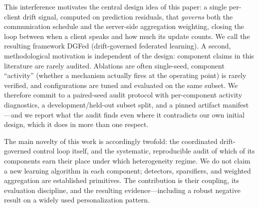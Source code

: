 \documentclass[journal]{IEEEtran}
\newcommand{\dgfed}{DGFed}
\begin{document}
This interference motivates the central design idea of this paper: a single per-client drift signal, computed on prediction residuals, that \emph{governs} both the communication schedule and the server-side aggregation weighting, closing the loop between when a client speaks and how much its update counts. We call the resulting framework \dgfed{} (drift-governed federated learning). A second, methodological motivation is independent of the design: component claims in this literature are rarely audited. Ablations are often single-seed, component ``activity'' (whether a mechanism actually fires at the operating point) is rarely verified, and configurations are tuned and evaluated on the same subset. We therefore commit to a paired-seed audit protocol with per-component activity diagnostics, a development/held-out subset split, and a pinned artifact manifest---and we report what the audit finds even where it contradicts our own initial design, which it does in more than one respect.

The main novelty of this work is accordingly twofold: the coordinated drift-governed control loop itself, and the systematic, reproducible audit of which of its components earn their place under which heterogeneity regime. We do not claim a new learning algorithm in each component; detectors, sparsifiers, and weighted aggregation are established primitives. The contribution is their coupling, its evaluation discipline, and the resulting evidence---including a robust negative result on a widely used personalization pattern.
\end{document}

